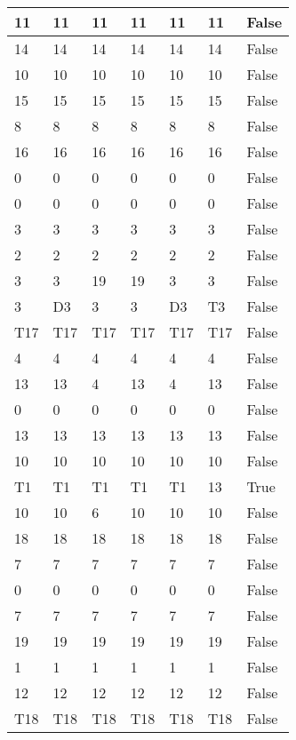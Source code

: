 \begin{longtable}[htbp]{| p{} | p{} | p{}| p{}| p{}| p{}| p{}|}
11 & 11 & 11 & 11 & 11 & 11 & False \\ \hline
14 & 14 & 14 & 14 & 14 & 14 & False \\ \hline
10 & 10 & 10 & 10 & 10 & 10 & False \\ \hline
15 & 15 & 15 & 15 & 15 & 15 & False \\ \hline
8 & 8 & 8 & 8 & 8 & 8 & False \\ \hline
16 & 16 & 16 & 16 & 16 & 16 & False \\ \hline
0 & 0 & 0 & 0 & 0 & 0 & False \\ \hline
0 & 0 & 0 & 0 & 0 & 0 & False \\ \hline
3 & 3 & 3 & 3 & 3 & 3 & False \\ \hline
2 & 2 & 2 & 2 & 2 & 2 & False \\ \hline
3 & 3 & 19 & 19 & 3 & 3 & False \\ \hline
3 & \multicolumn{1}{l|}{D3} & 3 & 3 & \multicolumn{1}{l|}{D3} & \multicolumn{1}{l|}{T3} & False \\ \hline
\multicolumn{1}{|l|}{T17} & \multicolumn{1}{l|}{T17} & \multicolumn{1}{l|}{T17} & \multicolumn{1}{l|}{T17} & \multicolumn{1}{l|}{T17} & \multicolumn{1}{l|}{T17} & False \\ \hline
4 & 4 & 4 & 4 & 4 & 4 & False \\ \hline
13 & 13 & 4 & 13 & 4 & 13 & False \\ \hline
0 & 0 & 0 & 0 & 0 & 0 & False \\ \hline
13 & 13 & 13 & 13 & 13 & 13 & False \\ \hline
10 & 10 & 10 & 10 & 10 & 10 & False \\ \hline
\multicolumn{1}{|l|}{T1} & \multicolumn{1}{l|}{T1} & \multicolumn{1}{l|}{T1} & \multicolumn{1}{l|}{T1} & \multicolumn{1}{l|}{T1} & 13 & True \\ \hline
10 & 10 & 6 & 10 & 10 & 10 & False \\ \hline
18 & 18 & 18 & 18 & 18 & 18 & False \\ \hline
7 & 7 & 7 & 7 & 7 & 7 & False \\ \hline
0 & 0 & 0 & 0 & 0 & 0 & False \\ \hline
7 & 7 & 7 & 7 & 7 & 7 & False \\ \hline
19 & 19 & 19 & 19 & 19 & 19 & False \\ \hline
1 & 1 & 1 & 1 & 1 & 1 & False \\ \hline
12 & 12 & 12 & 12 & 12 & 12 & False \\ \hline
\multicolumn{1}{|l|}{T18} & \multicolumn{1}{l|}{T18} & \multicolumn{1}{l|}{T18} & \multicolumn{1}{l|}{T18} & \multicolumn{1}{l|}{T18} & \multicolumn{1}{l|}{T18} & False \\ \hline

\end{longtable}
